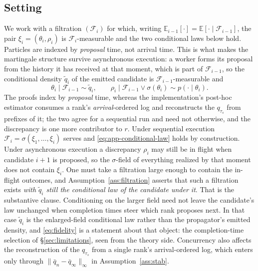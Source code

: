 \documentclass[10pt]{article}
\theoremstyle{plain}
\theoremstyle{definition}
\begin{document}
\subsection{Setting}\label{app:theory-setting}
We work with a filtration $(\mathcal{F}_i)$ for which, writing $\mathbb{E}_{i-1}[\cdot]=\mathbb{E}[\cdot\mid\mathcal{F}_{i-1}]$, the pair $\xi_i=(\theta_i,\rho_i)$ is $\mathcal{F}_i$-measurable and the two conditional laws below hold. Particles are indexed by \emph{proposal} time, not arrival time. This is what makes the martingale structure survive asynchronous execution: a worker forms its proposal from the history it has received at that moment, which is part of $\mathcal{F}_{i-1}$, so the conditional density $\tilde q_i$ of the emitted candidate is $\mathcal{F}_{i-1}$-measurable and
\begin{equation}
\theta_i\mid\mathcal{F}_{i-1}\sim \tilde q_i,
\qquad
\rho_i\mid\mathcal{F}_{i-1}\vee\sigma(\theta_i)\sim p(\cdot\mid\theta_i).
\label{eq:app-conditional-law}
\end{equation}
The proofs index by \emph{proposal} time, whereas the implementation's post-hoc estimator consumes a rank's \emph{arrival}-ordered log and reconstructs the $q_{\tau_s}$ from prefixes of it; the two agree for a sequential run and need not otherwise, and the discrepancy is one more contributor to $r$. Under sequential execution $\mathcal{F}_i=\sigma(\xi_1,\dots,\xi_i)$ serves and \eqref{eq:app-conditional-law} holds by construction. Under asynchronous execution a discrepancy $\rho_i$ may still be in flight when candidate $i+1$ is proposed, so the $\sigma$-field of everything realized by that moment does not contain $\xi_i$. One must take a filtration large enough to contain the in-flight outcomes, and Assumption~\ref{ass:filtration} asserts that such a filtration exists \emph{with $\tilde q_i$ still the conditional law of the candidate under it}. That is the substantive clause. Conditioning on the larger field need not leave the candidate's law unchanged when completion times steer which rank proposes next. In that case $\tilde q_i$ is the enlarged-field conditional law rather than the propagator's emitted density, and \eqref{eq:fidelity} is a statement about that object: the completion-time selection of \S\ref{sec:limitations}, seen from the theory side. Concurrency also affects the reconstruction of the $q_{\tau_s}$ from a single rank's arrival-ordered log, which enters only through $\|\bar q_n-\bar q_\infty\|_\infty$ in Assumption~\ref{ass:stab}.
\end{document}
